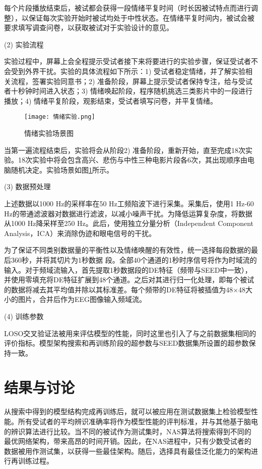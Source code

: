 每个片段播放结束后，被试都会获得一段情绪平复时间（时长因被试特点而进行调整），以保证每次实验开始时被试均处于中性状态。在情绪平复时间内，被试会被要求填写调查问卷，以获取被试对于实验设计的意见。

(2) 实验流程

实验过程中，屏幕上会全程提示受试者接下来将要进行的实验步骤，保证受试者不会受到外界干扰。实验的具体流程如下所示：1) 受试者稳定情绪，并了解实验相关流程，签署实验同意书；2) 准备阶段，屏幕上提示受试者保持专注，给与受试者十秒钟时间进入状态；3) 情绪唤起阶段，程序随机挑选三类影片中的一段进行播放；4) 情绪平复阶段，观影结束，受试者填写问卷，并平复情绪。
\begin{figure}[!h]
	\centering
	\texttt{[image: 情绪实验.png]}
	\caption{情绪实验场景图} 
	\label{fig3-2}
\end{figure}

当第一遍流程结束后，实验将会从阶段2) 准备阶段，重新开始，直至完成18次实验。18次实验中将会包含高兴、悲伤与中性三种电影片段各6次，其出现顺序由电脑随机决定。实验场景如图\ref{fig3-2}所示。

(3) 数据预处理

上述数据以1000 Hz的采样率在50 Hz工频陷波下进行采集。采集后，使用1 Hz-60 Hz的带通滤波器对数据进行滤波，以减小噪声干扰。为降低运算复杂度，将数据从1000 Hz降采样至250 Hz。此后，使用独立分量分析（Independent Component Analysis，ICA）\cite{4-29}来消除伪迹和眼电信号的干扰。

为了保证不同类别数据量的平衡性以及情绪唤醒的有效性，统一选择每段数据的最后360秒，并将其切片为1秒数据
段。全部40个通道的1秒时序信号将作为时域流的输入。对于频域流输入，首先提取1秒数据段的DE特征（频带与SEED中一致），并使用零填充将DE特征扩展到48个通道。之后对其进行归一化处理，即每个被试的数据将减去其平均值并除以其标准差。每个频带的DE特征将被插值为48×48大小的图片，合并后作为EEG图像输入频域流。

(4) 训练参数

LOSO交叉验证法被用来评估模型的性能，同时这里也引入了与之前数据集相同的评价指标。模型架构搜索和再训练阶段的超参数与SEED数据集所设置的超参数保持一致。

\section{结果与讨论}

从搜索中得到的模型结构完成再训练后，就可以被应用在测试数据集上检验模型性能。所有受试者的平均辨识准确率将作为模型性能的评判标准，并与其他基于脑电的辨识算法进行比较。当不同的被试作为测试集时，NAS算法将搜索得到不同的最优网络架构，带来高昂的时间开销。因此，在NAS进程中，只有少数受试者的数据被用作测试集，以获得一些最佳架构。随后，选择具有最佳泛化能力的架构进行再训练过程。

